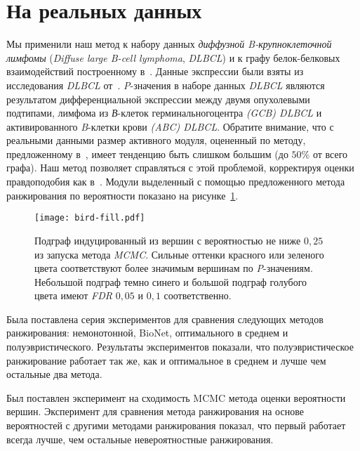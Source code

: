 \section{На реальных данных}

Мы применили наш метод к набору данных \emph{диффузной B-крупноклеточной
лимфомы} (\emph{Diffuse large B-cell lymphoma}, \emph{DLBCL}) и к графу
белок-белковых взаимодействий построенному в~\cite{Dittrich2008a}.  Данные
экспрессии были взяты из исследования \emph{DLBCL} от~\cite{Alizadeh2000}.
\emph{P}-значения в наборе данных \emph{DLBCL} являются результатом
дифференциальной экспрессии между двумя опухолевыми подтипами, лимфома из
\emph{В}-клеток герминальногоцентра \emph{(GCB) DLBCL} и активированного
\emph{B}-клетки крови \emph{(ABC) DLBCL}. Обратите внимание, что с реальными
данными размер активного модуля, оцененный по методу, предложенному
в~\cite{Dittrich2008a}, имеет тенденцию быть слишком большим (до $50\%$ от
всего графа). Наш метод позволяет справляться с этой проблемой, корректируя
оценки правдоподобия как в~\cite{Dittrich2008a}. Модули выделенный с помощью
предложенного метода ранжирования по вероятности показано на рисунке~\ref{fig:bird-fill}.
\begin{figure}
    \centering
    \texttt{[image: bird-fill.pdf]}
    \caption{
        Подграф индуцированный из вершин с вероятностью не ниже $0,25$ из
        запуска метода \emph{MCMC}.  Сильные оттенки красного или зеленого
        цвета соответствуют более значимым вершинам по \emph{P}-значениям.
        Небольшой подграф темно синего и большой подграф голубого цвета имеют
        \emph{FDR} $0,05$ и $0,1$ соответственно.
    }%
    \label{fig:bird-fill}%
\end{figure}





\chapterconclusion
Была поставлена серия экспериментов для сравнения следующих методов ранжирования:
немонотонной, BioNet, оптимального в среднем и полуэвристического.  Результаты
экспериментов показали, что полуэвристическое ранжирование работает так же, как
и оптимальное в среднем и лучше чем остальные два метода.

Был поставлен эксперимент на сходимость MCMC метода оценки вероятности вершин.
Эксперимент для сравнения метода ранжирования на основе вероятностей с другими
методами ранжирования показал, что первый работает всегда лучше, чем остальные
невероятностные ранжирования.
